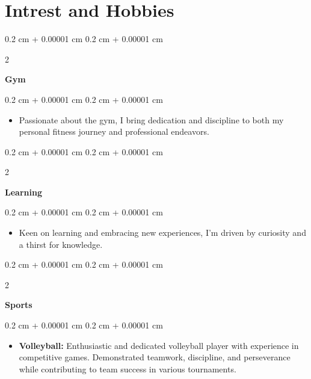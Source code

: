 \documentclass[10pt, letterpaper]{article}
\newenvironment{highlights}{
    \begin{itemize}[
        topsep=0.10 cm,
        parsep=0.10 cm,
        partopsep=0pt,
        itemsep=0pt,
        leftmargin=0.4 cm + 10pt
    ]
}{
    \end{itemize}
} %
\newenvironment{onecolentry}{
    \begin{adjustwidth}{
        0.2 cm + 0.00001 cm
    }{
        0.2 cm + 0.00001 cm
    }
}{
    \end{adjustwidth}
} %
\newenvironment{twocolentry}[2][]{
    \onecolentry
    \def\secondColumn{#2}
    \setcolumnwidth{\fill, 4.5 cm}
    \begin{paracol}{2}
}{
    \switchcolumn \raggedleft \secondColumn
    \end{paracol}
    \endonecolentry
} %
\begin{document}
    
    \section{Intrest and Hobbies}



        
        \begin{twocolentry}{
            
            
        \textit{{}}}
            \textbf{Gym}
            
        \end{twocolentry}
        

        \vspace{0.10 cm}
        \begin{onecolentry}
            \begin{highlights}
                \item Passionate about the gym, I bring dedication and
discipline to both my personal fitness journey and
  professional endeavors.
            \end{highlights}
        \end{onecolentry}
         
        \begin{twocolentry}{
            
            
        \textit{{}}}
            \textbf{Learning}
            
        \end{twocolentry}
        

        \vspace{0.10 cm}
        \begin{onecolentry}
            \begin{highlights}
                \item Keen on learning and embracing new experiences,
I'm driven by curiosity and a thirst for knowledge.
            \end{highlights}
        \end{onecolentry}

          \vspace{0.2cm}       
        \begin{twocolentry}{
            
            
        \textit{{}}}
            \textbf{Sports}
            
        \end{twocolentry}
        

        \vspace{0.10 cm}
        \begin{onecolentry}
            \begin{highlights}
                \item  
\textbf{Volleyball:} Enthusiastic and dedicated volleyball player with experience in competitive games. Demonstrated teamwork, discipline, and perseverance while contributing to team success in various tournaments.
            \end{highlights}
        \end{onecolentry}

    
\end{document}
